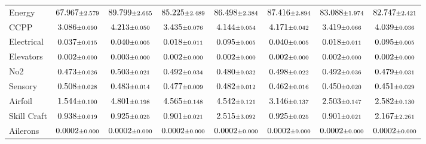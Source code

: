 \begin{table}[htbp]
{\begin{tabular}{lccccccc}
Energy & $67.967 \text{\scriptsize$\pm$2.579}$ & $89.799 \text{\scriptsize$\pm$2.665}$ & $85.225 \text{\scriptsize$\pm$2.489}$ & $86.498 \text{\scriptsize$\pm$2.384}$ & $87.416 \text{\scriptsize$\pm$2.894}$ & $83.088 \text{\scriptsize$\pm$1.974}$ & $82.747 \text{\scriptsize$\pm$2.421}$ \\
CCPP & $3.086 \text{\scriptsize$\pm$0.090}$ & $4.213 \text{\scriptsize$\pm$0.050}$ & $3.435 \text{\scriptsize$\pm$0.076}$ & $4.144 \text{\scriptsize$\pm$0.054}$ & $4.171 \text{\scriptsize$\pm$0.042}$ & $3.419 \text{\scriptsize$\pm$0.066}$ & $4.039 \text{\scriptsize$\pm$0.036}$ \\
Electrical & $0.037 \text{\scriptsize$\pm$0.015}$ & $0.040 \text{\scriptsize$\pm$0.005}$ & $0.018 \text{\scriptsize$\pm$0.011}$ & $0.095 \text{\scriptsize$\pm$0.005}$ & $0.040 \text{\scriptsize$\pm$0.005}$ & $0.018 \text{\scriptsize$\pm$0.011}$ & $0.095 \text{\scriptsize$\pm$0.005}$ \\
Elevators & $0.002 \text{\scriptsize$\pm$0.000}$ & $0.003 \text{\scriptsize$\pm$0.000}$ & $0.002 \text{\scriptsize$\pm$0.000}$ & $0.002 \text{\scriptsize$\pm$0.000}$ & $0.002 \text{\scriptsize$\pm$0.000}$ & $0.002 \text{\scriptsize$\pm$0.000}$ & $0.002 \text{\scriptsize$\pm$0.000}$ \\
No2 & $0.473 \text{\scriptsize$\pm$0.026}$ & $0.503 \text{\scriptsize$\pm$0.021}$ & $0.492 \text{\scriptsize$\pm$0.034}$ & $0.480 \text{\scriptsize$\pm$0.032}$ & $0.498 \text{\scriptsize$\pm$0.022}$ & $0.492 \text{\scriptsize$\pm$0.036}$ & $0.479 \text{\scriptsize$\pm$0.031}$ \\
Sensory & $0.508 \text{\scriptsize$\pm$0.028}$ & $0.483 \text{\scriptsize$\pm$0.014}$ & $0.477 \text{\scriptsize$\pm$0.009}$ & $0.482 \text{\scriptsize$\pm$0.012}$ & $0.462 \text{\scriptsize$\pm$0.016}$ & $0.450 \text{\scriptsize$\pm$0.020}$ & $0.451 \text{\scriptsize$\pm$0.029}$ \\
Airfoil & $1.544 \text{\scriptsize$\pm$0.100}$ & $4.801 \text{\scriptsize$\pm$0.198}$ & $4.565 \text{\scriptsize$\pm$0.148}$ & $4.542 \text{\scriptsize$\pm$0.121}$ & $3.146 \text{\scriptsize$\pm$0.137}$ & $2.503 \text{\scriptsize$\pm$0.147}$ & $2.582 \text{\scriptsize$\pm$0.130}$ \\
Skill Craft & $0.938 \text{\scriptsize$\pm$0.019}$ & $0.925 \text{\scriptsize$\pm$0.025}$ & $0.901 \text{\scriptsize$\pm$0.021}$ & $2.515 \text{\scriptsize$\pm$3.092}$ & $0.925 \text{\scriptsize$\pm$0.025}$ & $0.901 \text{\scriptsize$\pm$0.021}$ & $2.167 \text{\scriptsize$\pm$2.261}$ \\
Ailerons & $0.0002 \text{\scriptsize$\pm$0.000}$ & $0.0002 \text{\scriptsize$\pm$0.000}$ & $0.0002 \text{\scriptsize$\pm$0.000}$ & $0.0002 \text{\scriptsize$\pm$0.000}$ & $0.0002 \text{\scriptsize$\pm$0.000}$ & $0.0002 \text{\scriptsize$\pm$0.000}$ & $0.0002 \text{\scriptsize$\pm$0.000}$ \\
\bottomrule
\end{tabular}
}
\end{table}


